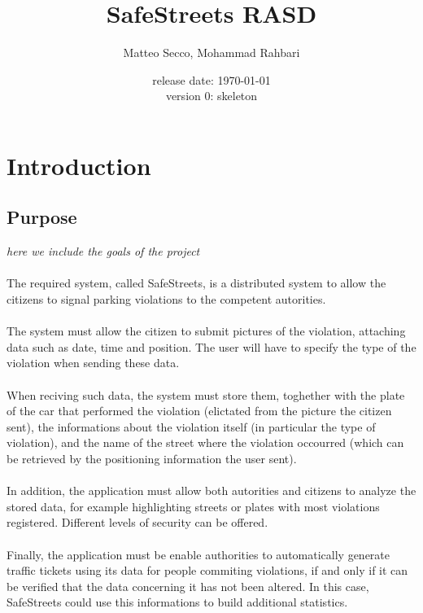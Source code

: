 \documentclass{article}
\title{SafeStreets RASD}
\date{release date: \today\\version 0: skeleton}
\author{Matteo Secco, Mohammad Rahbari}
\begin{document}
\maketitle
\newpage
\tableofcontents
\pagebreak
{}


\section{Introduction}

	\subsection{Purpose} \textit{here we	 include	 the	 goals of the project}
	
		\paragraph{}The required system, called SafeStreets, is a distributed system to allow the citizens to signal parking violations to the competent autorities.
		\paragraph{}The system must allow the citizen to submit pictures of the violation, attaching data such as date, time and position. The user will have to specify the type of the violation when sending these data. 
		\paragraph{}When reciving such data, the system must store them, toghether with the plate of the car that performed the violation (elictated from the picture the citizen sent), the informations about the violation itself (in particular the type of violation), and the name of the street where the violation occourred (which can be retrieved by the positioning information the user sent).
		\paragraph{}In addition, the application must allow both autorities and citizens to analyze the stored data, for example highlighting streets or plates with most violations registered. Different levels of security can be offered.
		\paragraph{}Finally, the application must be enable authorities to automatically generate traffic tickets using its data for people commiting violations, if and only if it can be verified that the data concerning it has not been altered. In this case, SafeStreets could use this informations to build additional statistics.
\end{document}
